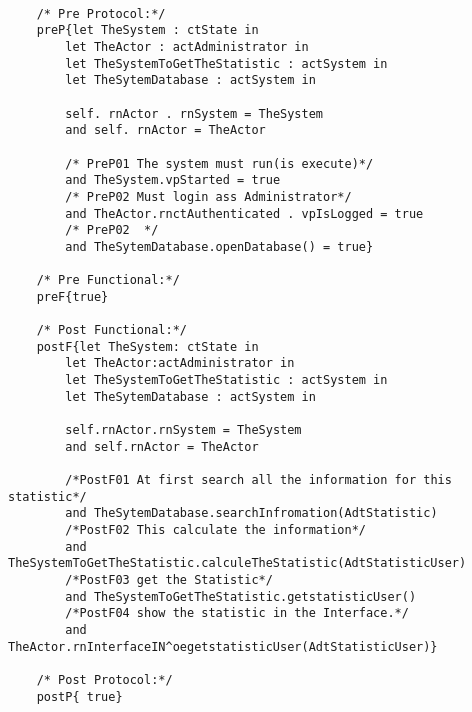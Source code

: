 	\scriptsize
	\vspace{0.5cm}
	\begin{lstlisting}[style=MessirStyle,firstnumber=auto,captionpos=b,caption={\msrmessir (MCL-oriented) specification of the operation \emph{oegetstatisticUser}.},label=OM-actAdministrator-oegetstatisticUser-MCL-LST]

	/* Pre Protocol:*/ 
	preP{let TheSystem : ctState in 
		let TheActor : actAdministrator in 
		let TheSystemToGetTheStatistic : actSystem in 
		let TheSytemDatabase : actSystem in 
		
		self. rnActor . rnSystem = TheSystem 
		and self. rnActor = TheActor
		
		/* PreP01 The system must run(is execute)*/
		and TheSystem.vpStarted = true
		/* PreP02 Must login ass Administrator*/
		and TheActor.rnctAuthenticated . vpIsLogged = true
		/* PreP02  */
		and TheSytemDatabase.openDatabase() = true}
	
	/* Pre Functional:*/
	preF{true}
	
	/* Post Functional:*/ 
	postF{let TheSystem: ctState in
	    let TheActor:actAdministrator in
	    let TheSystemToGetTheStatistic : actSystem in
	    let TheSytemDatabase : actSystem in 
	    
		self.rnActor.rnSystem = TheSystem
	    and self.rnActor = TheActor
	    
	    /*PostF01 At first search all the information for this statistic*/
	    and TheSytemDatabase.searchInfromation(AdtStatistic)
	    /*PostF02 This calculate the information*/
	    and TheSystemToGetTheStatistic.calculeTheStatistic(AdtStatisticUser)
	    /*PostF03 get the Statistic*/
	    and TheSystemToGetTheStatistic.getstatisticUser()
	   	/*PostF04 show the statistic in the Interface.*/
	   	and TheActor.rnInterfaceIN^oegetstatisticUser(AdtStatisticUser)}
	
	/* Post Protocol:*/ 
	postP{ true}
	
	\end{lstlisting}
	\normalsize 
	
	
	
	






